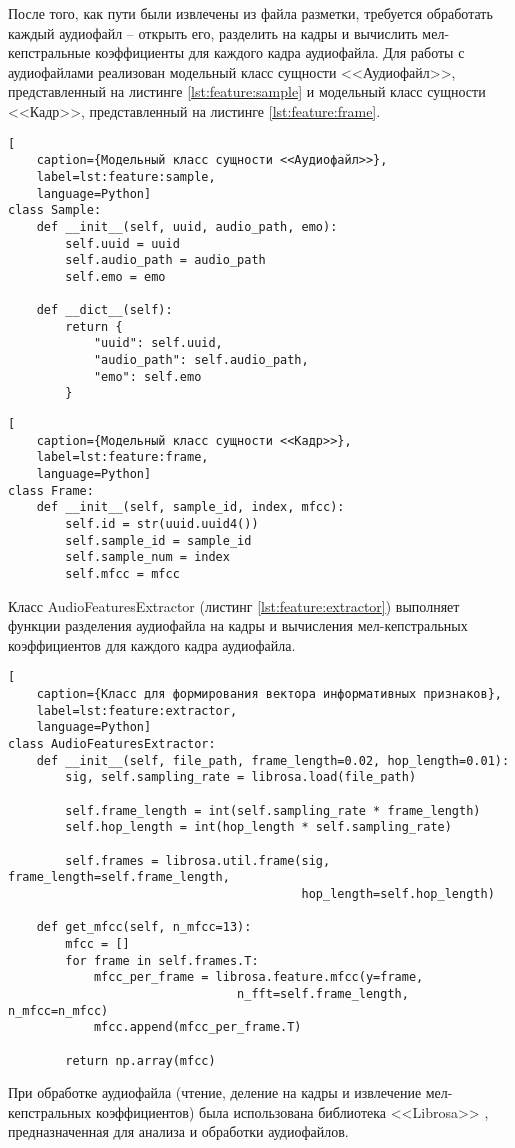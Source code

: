 После того, как пути были извлечены из файла разметки, требуется обработать каждый аудиофайл -- открыть его, разделить на кадры и вычислить мел-кепстральные коэффициенты для каждого кадра аудиофайла. Для работы с аудиофайлами реализован модельный класс сущности <<Аудиофайл>>, представленный на листинге \ref{lst:feature:sample} и модельный класс сущности <<Кадр>>, представленный на листинге \ref{lst:feature:frame}.
\begin{lstlisting}[
	caption={Модельный класс сущности <<Аудиофайл>>},
	label=lst:feature:sample,
	language=Python]
class Sample:
    def __init__(self, uuid, audio_path, emo):
        self.uuid = uuid
        self.audio_path = audio_path
        self.emo = emo

    def __dict__(self):
        return {
            "uuid": self.uuid,
            "audio_path": self.audio_path,
            "emo": self.emo
        }
\end{lstlisting}

\begin{lstlisting}[
	caption={Модельный класс сущности <<Кадр>>},
	label=lst:feature:frame,
	language=Python]
class Frame:
    def __init__(self, sample_id, index, mfcc):
        self.id = str(uuid.uuid4())
        self.sample_id = sample_id
        self.sample_num = index
        self.mfcc = mfcc
\end{lstlisting}

Класс AudioFeaturesExtractor (листинг \ref{lst:feature:extractor}) выполняет функции разделения аудиофайла на кадры и вычисления мел-кепстральных коэффициентов для каждого кадра аудиофайла.
\begin{lstlisting}[
	caption={Класс для формирования вектора информативных признаков},
	label=lst:feature:extractor,
	language=Python]
class AudioFeaturesExtractor:
    def __init__(self, file_path, frame_length=0.02, hop_length=0.01):
        sig, self.sampling_rate = librosa.load(file_path)

        self.frame_length = int(self.sampling_rate * frame_length)
        self.hop_length = int(hop_length * self.sampling_rate)

        self.frames = librosa.util.frame(sig, frame_length=self.frame_length,
        								 hop_length=self.hop_length)

    def get_mfcc(self, n_mfcc=13):
        mfcc = []
        for frame in self.frames.T:
            mfcc_per_frame = librosa.feature.mfcc(y=frame, 
            					n_fft=self.frame_length, n_mfcc=n_mfcc)
            mfcc.append(mfcc_per_frame.T)

        return np.array(mfcc)
\end{lstlisting}
При обработке аудиофайла (чтение, деление на кадры и извлечение мел-кепстральных коэффициентов) была использована библиотека <<Librosa>> \cite{librosa}, предназначенная для анализа и обработки аудиофайлов. 

